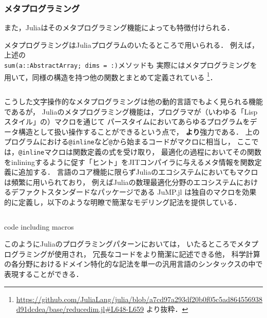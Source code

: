 \subsubsection{メタプログラミング} \label{subsubsection:metaprogramming}

また，Juliaはそのメタプログラミング機能によっても特徴付けられる．

メタプログラミングはJuliaプログラムのいたるところで用いられる．
例えば，上述の\\\verb|sum(a::AbstractArray; dims = :)|メソッドも
実際にはメタプログラミングを用いて，同様の構造を持つ他の関数とまとめて定義されている
\footnote{
  \url{https://github.com/JuliaLang/julia/blob/a7cd97a293df20b0f05c5ad864556938d91dcdea/base/reducedim.jl\#L648-L659}
  より抜粋．
}．

\inputminted[frame=lines, firstline=3, lastline=12, breaklines]{julia}{src/sums_def.jl}

こうした文字操作的なメタプログラミングは他の動的言語でもよく見られる機能であるが，
Juliaのメタプログラミング機能は，プログラマが（いわゆる「Lispスタイル」の）マクロを通じて
パースタイムにおいてあらゆるプログラムをデータ構造として扱い操作することができるという点で，
\textbf{より}強力である．
上のプログラムにおける\verb|@inline|など\verb|@|から始まるコードがマクロに相当し，
ここでは，\verb|@inline|マクロは関数定義の式を受け取り，
最適化の過程においてその関数をinliningするように促す「ヒント」をJITコンパイラに与えるメタ情報を関数定義に追加する．
言語のコア機能に限らずJuliaのエコシステムにおいてもマクロは頻繁に用いられており，
例えばJuliaの数理最適化分野のエコシステムにおけるデファクトスタンダードなパッケージである
JuMP.jl\cite{DunningHuchetteLubin2017}
は独自のマクロを効果的に定義し，以下のような明瞭で簡潔なモデリング記法を提供している．

\begin{listing}[ht]
  \inputminted[frame=lines, linenos, firstnumber=1, firstline=4, lastline=10]{julia}{src/jump.jl}
  \caption{code including macros}
  \label{lst:target2}
\end{listing}

このようにJuliaのプログラミングパターンにおいては，
いたるところでメタプログラミングが使用され\footnotemark，
冗長なコードをより簡潔に記述できる他，
科学計算の各分野におけるドメイン特化的な記法を単一の汎用言語のシンタックスの中で表現することができる\cite{jeff-phd}．


